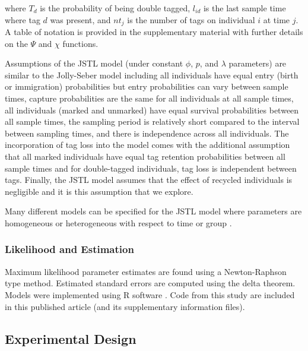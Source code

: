 \documentclass[12pt]{article}
\begin{document}
\noindent where $T_d$ is the probability of being double tagged, $l_{id}$ is the last sample time where tag $d$ was present, and $nt_{j}$ is the number of tags on individual $i$ at time $j$.  A table of notation is provided in the supplementary material with further details on the $\Psi$ and $\chi$ functions.

Assumptions of the JSTL model (under constant $\phi$, $p$, and $\lambda$ parameters) are similar to the Jolly-Seber model \citep{Schwarz:1996} including all individuals have equal entry (birth or immigration) probabilities but entry probabilities can vary between sample times, capture probabilities are the same for all individuals at all sample times,  all individuals (marked and unmarked) have equal survival
  probabilities between all sample times, the sampling period is relatively short compared to the interval between sampling times, and there is independence across all individuals.  The incorporation of tag loss into the model comes with the additional assumption that all marked individuals have equal tag retention probabilities between all sample times and for double-tagged individuals, tag loss is independent between tags.  Finally, the JSTL model assumes that the effect of recycled individuals is negligible and it is this assumption that we explore. 

Many different models can be specified for the JSTL model where parameters are homogeneous or heterogeneous with respect to time \citep{Cowen:2006} or group  \citep{Xu:2014}. 


\subsubsection{Likelihood and
Estimation}\label{likelihood-and-estimation}

Maximum likelihood parameter estimates are found using a Newton-Raphson type method. Estimated standard errors are computed using the delta theorem. Models were implemented using R software \citep{R}. Code from this study are included in this published article (and its supplementary information files).


\subsection{Experimental Design}\label{experimental-design}
\end{document}
